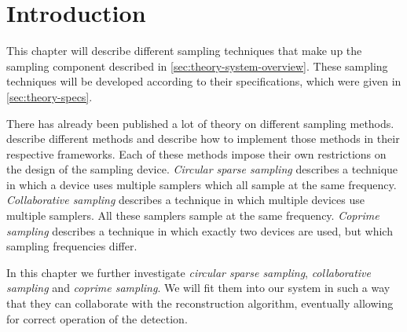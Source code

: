 \documentclass[a4paper, openany, oneside]{memoir}
\begin{document}
\section{Introduction}
This chapter will describe different sampling techniques that make up the sampling component described in \cref{sec:theory-system-overview}. These sampling techniques will be developed according to their specifications, which were given in \cref{sec:theory-specs}.

There has already been published a lot of theory on different sampling methods. \cite{ariananda2012compressive,ariananda2014cooperative,pal2011coprime} describe different methods and describe how to implement those methods in their respective frameworks. Each of these methods impose their own restrictions on the design of the sampling device. \textit{Circular sparse sampling} \cite{ariananda2012compressive} describes a technique in which a device uses multiple samplers which all sample at the same frequency. \textit{Collaborative sampling} \cite{ariananda2014cooperative} describes a technique in which multiple devices use multiple samplers. All these samplers sample at the same frequency. \textit{Coprime sampling} describes a technique in which exactly two devices are used, but which sampling frequencies differ.

In this chapter we further investigate \textit{circular sparse sampling}, \textit{collaborative sampling} and \textit{coprime sampling}. We will fit them into our system in such a way that they can collaborate with the reconstruction algorithm, eventually allowing for correct operation of the detection. 


\end{document}
